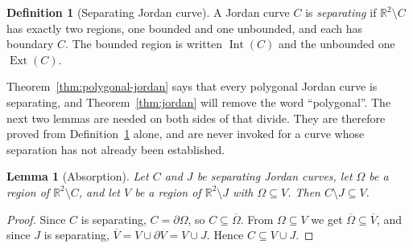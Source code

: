\documentclass[11pt]{article}
\theoremstyle{mainplain}
\newtheorem{lemma}[theorem]{Lemma}
\theoremstyle{mainroman}
\theoremstyle{definition}
\newtheorem{definition}[theorem]{Definition}
\numberwithin{equation}{section}
\begin{document}
\begin{definition}[Separating Jordan curve]\label{def:separating}
A Jordan curve $C$ is \emph{separating} if $\mathbb R^2\setminus C$ has
exactly two regions, one bounded and one unbounded, and each has
boundary $C$. The bounded region is written $\operatorname{Int}(C)$ and
the unbounded one $\operatorname{Ext}(C)$.
\end{definition}

Theorem~\ref{thm:polygonal-jordan} says that every polygonal Jordan
curve is separating, and Theorem~\ref{thm:jordan} will remove the word
``polygonal''. The next two lemmas are needed on both sides of that
divide. They are therefore proved from Definition~\ref{def:separating}
alone, and are never invoked for a curve whose separation has not
already been established.

\begin{lemma}[Absorption]\label{lem:absorption}
Let $C$ and $J$ be separating Jordan curves, let $\Omega$ be a region
of $\mathbb R^2\setminus C$, and let $V$ be a region of
$\mathbb R^2\setminus J$ with $\Omega\subseteq V$. Then
$C\setminus J\subseteq V$.
\end{lemma}
\begin{proof}
Since $C$ is separating, $C=\partial\Omega$, so
$C\subseteq\overline\Omega$. From $\Omega\subseteq V$ we get
$\overline\Omega\subseteq\overline V$, and since $J$ is separating,
$\overline V=V\cup\partial V=V\cup J$. Hence $C\subseteq V\cup J$.
\end{proof}
\end{document}
